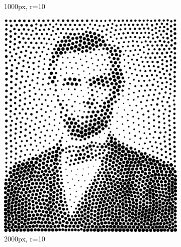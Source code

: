 \documentclass[11pt]{article}
\begin{document}
\begin{figure}[H]
\begin{subfigure}[b]{0.2\linewidth}
		\caption{1000px, r=10}
	\end{subfigure}
	\begin{subfigure}[b]{0.2\linewidth}
		\includegraphics[width=\linewidth]{pix/vr_AL_2000_r10.png}
		\caption{2000px, r=10}
	\end{subfigure}
	\begin{subfigure}[b]{0.2\linewidth}

\end{subfigure}
\end{figure}
\end{document}
